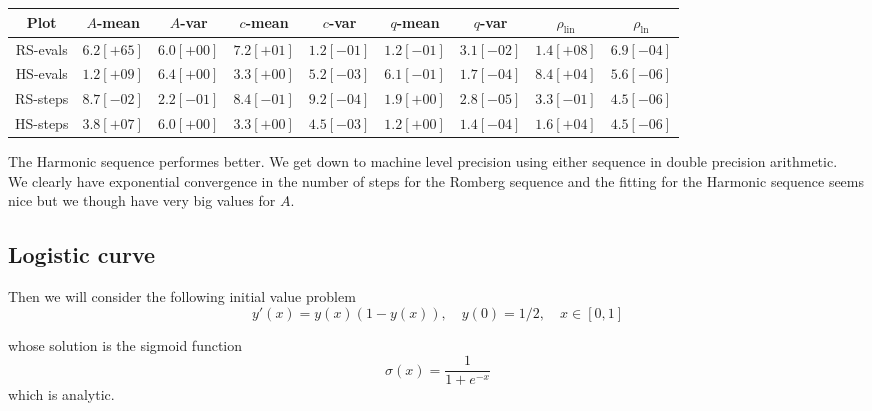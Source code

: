 \begin{table}[H]
    \centering
    \small
    \begin{tabular}{c||c|c|c|c|c|c|c|c}
Plot & \(A\)-mean & \(A\)-var & \(c\)-mean & \(c\)-var & \(q\)-mean & \(q\)-var & \(\rho_{\operatorname{lin}}\) & \(\rho_{\ln}\)\\\hline
\rowcolor{red}
RS-evals & \(6.2[+65]\) & \(6.0[+00]\) & \(7.2[+01]\) & \(1.2[-01]\) & \(1.2[-01]\) & \(3.1[-02]\) & \(1.4[+08]\) & \(6.9[-04]\) \\
\rowcolor{yellow}
HS-evals & \(1.2[+09]\) & \(6.4[+00]\) & \(3.3[+00]\) & \(5.2[-03]\) & \(6.1[-01]\) & \(1.7[-04]\) & \(8.4[+04]\) & \(5.6[-06]\) \\
\rowcolor{green}
RS-steps & \(8.7[-02]\) & \(2.2[-01]\) & \(8.4[-01]\) & \(9.2[-04]\) & \(1.9[+00]\) & \(2.8[-05]\) & \(3.3[-01]\) & \(4.5[-06]\) \\
\rowcolor{yellow}
HS-steps & \(3.8[+07]\) & \(6.0[+00]\) & \(3.3[+00]\) & \(4.5[-03]\) & \(1.2[+00]\) & \(1.4[-04]\) & \(1.6[+04]\) & \(4.5[-06]\) \\
    \end{tabular}
    \label{tab:my_label}
\end{table}

The Harmonic sequence performes better. We get down to machine level precision using either sequence in double precision arithmetic.\\

We clearly have exponential convergence in the number of steps for the Romberg sequence and the fitting for the Harmonic sequence seems nice but we though have very big values for \(A\).

\subsection{Logistic curve}

Then we will consider the following initial value problem
\begin{equation}\label{43}
y'(x) = y(x)(1-y(x)),\quad y(0) = 1/2, \quad x\in [0,1]
\end{equation}

whose solution is the sigmoid function
\[
\sigma(x) = \frac{1}{1 + e^{-x}}
\]
which is analytic.

